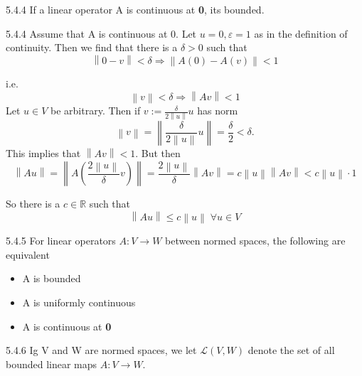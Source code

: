 \documentclass[a4paper,norsk]{article}
\renewcommand{\leq}{\leqslant}
\renewcommand{\epsilon}{\varepsilon}
\begin{document}
\begin{lemmabox}{5.4.4}{}
If a linear operator A is continuous at \textbf{0}, its bounded.
\begin{proofbox}{5.4.4}{}
  Assume that A is continuous at 0. Let $ u = 0, \epsilon =1 $ as in the definition of continuity. Then we find that there is a $ \delta > 0 $ such that 
  \[
      \left\lVert 0-v \right\rVert < \delta \Rightarrow \left\lVert A(0) - A(v) \right\rVert < 1
  \]

  i.e.
  \[
      \left\lVert v \right\rVert < \delta \Rightarrow \left\lVert Av \right\rVert < 1
  \]
    Let $ u \in V  $ be arbitrary. Then if $ v := \frac{ \delta      }{ 2 \left\lVert u \right\rVert  } u $ has norm 
    \[
        \left\lVert v \right\rVert = \left\lVert \frac{ \delta  }{ 2 \left\lVert u \right\rVert  } u \right\rVert = \frac{ \delta  }{ 2 } < \delta.
    \]
    This implies that $ \left\lVert Av  \right\rVert < 1 $. But then
    \[
        \left\lVert Au \right\rVert = \left\lVert A \left( \frac{ 2 \left\lVert u \right\rVert   }{ \delta  } v \right)  \right\rVert =  \frac{ 2 \left\lVert u \right\rVert  }{ \delta  } \left\lVert Av \right\rVert = c \left\lVert u \right\rVert \left\lVert Av \right\rVert  < c \left\lVert u \right\rVert \cdot 1
    \] 
    
    So there is a $ c \in \mathbb{R} $ such that 
    \[
        \left\lVert Au \right\rVert \leq c \left\lVert u \right\rVert \; \forall  u \in V
    \]
\end{proofbox} 
\end{lemmabox}


\begin{theorembox}{5.4.5}{}
For linear operators $ A : V \to W $ between normed spaces, the following are equivalent
\begin{itemize}
    \item[i)] A is bounded
    \item[ii)] A is uniformly continuous
    \item[iii)] A is continuous at \textbf{0}  
\end{itemize}
\end{theorembox}


\begin{definitionbox}{5.4.6}{}
Ig V and W are normed spaces, we let $ \mathcal{L} \left( V, W \right)  $ denote the set of all bounded linear maps $ A : V \to W $.
\end{definitionbox}
\end{document}
